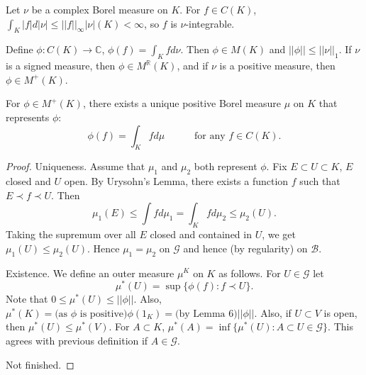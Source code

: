 Let $\nu$ be a complex Borel measure on $K$. For $f\in C(K)$,
$\int_K |f|d|\nu|\leq ||f||_\infty |\nu|(K)<\infty$,
so $f$ is $\nu$-integrable.

Define $\phi:C(K)\to\mathbb{C}$, $\phi(f)=\int_K fd\nu$.
Then $\phi\in M(K)$ and $||\phi||\leq ||\nu||_1$.
If $\nu$ is a signed measure, then $\phi\in M^\mathbb{R}(K)$,
and if $\nu$ is a positive measure, then $\phi\in M^+(K)$.

\begin{theorem}
For $\phi\in M^+(K)$,
there exists a unique positive Borel measure $\mu$ on $K$ that represents $\phi$:
$$\phi(f)=\int_K fd\mu\ \ \ \ \ \ \ \ \ \ \ \ \text{ for any $f\in C(K)$}.$$
\end{theorem}
\begin{proof}
  Uniqueness. Assume that $\mu_1$ and $\mu_2$ both represent $\phi$.
  Fix $E\subset U\subset K$, $E$ closed and $U$ open.
  By Urysohn's Lemma, there exists a function $f$
  such that $E\prec f\prec U$.
  Then
  $$\mu_1(E)\leq \int fd\mu_1=\int_K fd\mu_2\leq \mu_2(U).$$
  Taking the supremum over all $E$ closed and contained in $U$,
  we get $\mu_1(U)\leq \mu_2(U)$.
  Hence $\mu_1=\mu_2$ on $\mathcal{G}$ and hence (by regularity) on $\mathcal{B}$.

  Existence. We define an outer measure $\mu^K$ on $K$ as follows.
  For $U\in\mathcal{G}$ let $$\mu^*(U)=\sup\{\phi(f):f\prec U\}.$$
  Note that $0\leq \mu^*(U)\leq ||\phi||$.
  Also,
  $\mu^*(K)=\text{(as $\phi$ is positive)}\phi(1_K)=\text{(by Lemma 6)}||\phi||$.
  Also, if $U\subset V$ is open, then $\mu^*(U)\leq \mu^*(V)$.
  For $A\subset K$, $\mu^*(A)=\inf\{\mu^*(U):A\subset U\in\mathcal{G}\}$.
  This agrees with previous definition if $A\in\mathcal{G}$.

  Not finished.
\end{proof}


















%
